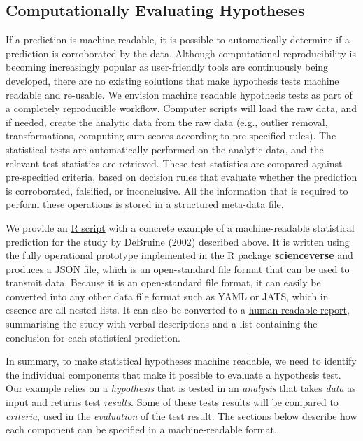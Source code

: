 \documentclass[
  english,
  doc,floatsintext]{apa6}
\begin{document}
\hypertarget{computationally-evaluating-hypotheses}{%
\subsection{Computationally Evaluating Hypotheses}\label{computationally-evaluating-hypotheses}}

If a prediction is machine readable, it is possible to automatically determine if a prediction is corroborated by the data. Although computational reproducibility is becoming increasingly popular as user-friendly tools are continuously being developed, there are no existing solutions that make hypothesis tests machine readable and re-usable. We envision machine readable hypothesis tests as part of a completely reproducible workflow. Computer scripts will load the raw data, and if needed, create the analytic data from the raw data (e.g., outlier removal, transformations, computing sum scores according to pre-specified rules). The statistical tests are automatically performed on the analytic data, and the relevant test statistics are retrieved. These test statistics are compared against pre-specified criteria, based on decision rules that evaluate whether the prediction is corroborated, falsified, or inconclusive. All the information that is required to perform these operations is stored in a structured meta-data file.

We provide an \href{example/main/example.Rmd}{R script} with a concrete example of a machine-readable statistical prediction for the study by DeBruine (2002) described above. It is written using the fully operational prototype implemented in the R package \href{https://scienceverse.github.io/scienceverse/}{\textbf{scienceverse}} and produces a \href{example/postreg.json}{JSON file}, which is an open-standard file format that can be used to transmit data. Because it is an open-standard file format, it can easily be converted into any other data file format such as YAML or JATS, which in essence are all nested lists. It can also be converted to a \href{example/postreg.html}{human-readable report}, summarising the study with verbal descriptions and a list containing the conclusion for each statistical prediction.

In summary, to make statistical hypotheses machine readable, we need to identify the individual components that make it possible to evaluate a hypothesis test. Our example relies on a \emph{hypothesis} that is tested in an \emph{analysis} that takes \emph{data} as input and returns test \emph{results}. Some of these tests results will be compared to \emph{criteria}, used in the \emph{evaluation} of the test result. The sections below describe how each component can be specified in a machine-readable format.
\end{document}
